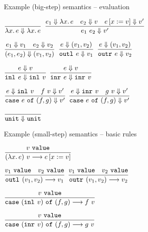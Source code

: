 \documentclass{beamer}
\begin{document}
\begin{frame}{Example (big-step) semantics -- evaluation}

\begin{center}
  $\infrule{}{\bigstep{\fun{x}{e}}{\fun{x}{e}}}$ \quad
  $\infrule{\bigstep{e_1}{\fun{x}{e}} \quad \bigstep{e_2}{v} \quad \bigstep{\subst{e}{x}{v}}{v'}}{\bigstep{\app{e_1}{e_2}}{v'}}$

  \vspace{2em}

  $\displaystyle \frac{e_1 \Downarrow v_1 \quad e_2 \Downarrow v_2}{(e_1, e_2) \Downarrow (v_1, v_2)} \textsc{\footnotesize{}}$ \quad
  $\displaystyle \frac{e \Downarrow (v_1, v_2)}{\texttt{outl}_{}\ e \Downarrow v_1} \textsc{\footnotesize{}}$ \quad
  $\displaystyle \frac{e \Downarrow (v_1, v_2)}{\texttt{outr}_{}\ e \Downarrow v_2} \textsc{\footnotesize{}}$ \quad

  \vspace{2em}

  $\displaystyle \frac{e \Downarrow v}{\texttt{inl}_{}\ e \Downarrow \texttt{inl}_{}\ v} \textsc{\footnotesize{}}$ \quad
  $\displaystyle \frac{e \Downarrow v}{\texttt{inr}_{}\ e \Downarrow \texttt{inr}_{}\ v} \textsc{\footnotesize{}}$ \quad

  \vspace{2em}

  $\infrule{\bigstep{e}{\inl{v}} \quad \bigstep{\app{f}{v}}{v'}}{\bigstep{\case{e}{f}{g}}{v'}}$ \quad
  $\infrule{\bigstep{e}{\inr{v}} \quad \bigstep{\app{g}{v}}{v'}}{\bigstep{\case{e}{f}{g}}{v'}}$

  \vspace{2em}

  $\displaystyle \frac{}{\texttt{unit} \Downarrow \texttt{unit}} \textsc{\footnotesize{}}$ \quad
\end{center}

\end{frame}

\begin{frame}{Example (small-step) semantics -- basic rules}

\begin{center}
  $\infrule{\val{v}}{\smallstep{\app{(\fun{x}{e})}{v}}{\subst{e}{x}{v}}}$

  \vspace{2em}

  $\displaystyle \frac{v_1\ \texttt{value} \quad v_2\ \texttt{value}}{\texttt{outl}_{}\ (v_1, v_2) \longrightarrow v_1} \textsc{\footnotesize{}}$ \quad
  $\displaystyle \frac{v_1\ \texttt{value} \quad v_2\ \texttt{value}}{\texttt{outr}_{}\ (v_1, v_2) \longrightarrow v_2} \textsc{\footnotesize{}}$

  \vspace{2em}

  $\infrule{\val{v}}{\smallstep{\case{(\inl{v})}{f}{g}}{\app{f}{v}}}$

  \vspace{2em}

  $\infrule{\val{v}}{\smallstep{\case{(\inr{v})}{f}{g}}{\app{g}{v}}}$

\end{center}

\end{frame}
\end{document}
